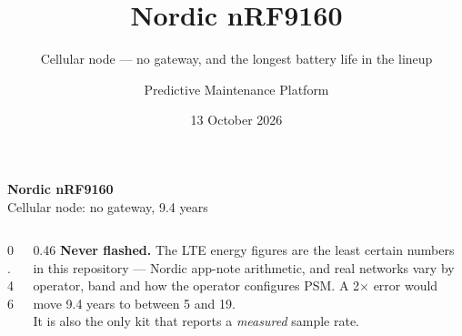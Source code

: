 \documentclass[aspectratio=169,10pt]{beamer}
\title[nRF9160 node]{Nordic nRF9160}
\subtitle{Cellular node --- no gateway, and the longest battery life in the lineup}
\author{Predictive Maintenance Platform}
\date{13 October 2026}
\begin{document}
\begin{frame}[plain]
  \vspace{5mm}
  {\LARGE\bfseries Nordic nRF9160}\\[2mm]
  {\large\color{pdmink2} Cellular node: no gateway, 9.4 years}\par
  \vspace{5mm}\noindent{\color{pdmrule}\rule{\linewidth}{0.4pt}}\par
  \vspace{3mm}
  \begin{columns}[T]
    \begin{column}{0.46\textwidth}
      \scriptsize
      \\[1mm]
      \\[1mm]
      \\[1mm]
      \\[1mm]
      \\[1mm]
    \end{column}
    \begin{column}{0.46\textwidth}
      \scriptsize\color{pdmink2}
      \textbf{Never flashed.} The LTE energy figures are the least certain
      numbers in this repository --- Nordic app-note arithmetic, and real
      networks vary by operator, band and how the operator configures PSM. A
      2$\times$ error would move 9.4 years to between 5 and 19.
      \\[2mm]
      It is also the only kit that reports a \emph{measured} sample rate.
    \end{column}
  \end{columns}
\end{frame}
\end{document}
